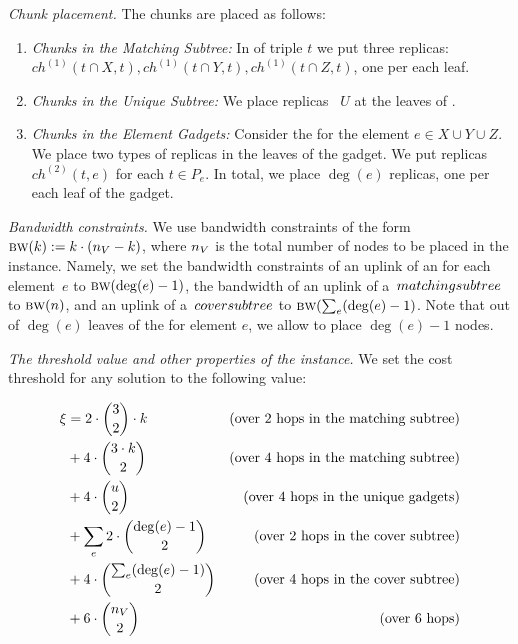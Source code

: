 \emph{Chunk placement.}
The chunks are placed as follows:
\begin{enumerate}
  \item \emph{Chunks in the Matching Subtree:} In {\TripleGadget} of triple $t$ we put
  three replicas:
 ~$ch^{(1)}(t \cap X, t), ch^{(1)}(t \cap Y, t), ch^{(1)}(t \cap Z, t)$, one per each leaf.
  \item \emph{Chunks in the Unique Subtree:} We place replicas
 ~$U$ at the leaves of \UnqGadgets.
 \item \emph{Chunks in the Element Gadgets:} Consider the \ElGadget{} for the element $e \in X\cup Y\cup Z$.
 We place two types of replicas in the leaves of the gadget.
 We put replicas $ch^{(2)}(t, e)$ for each $t \in P_e$.
 In total, we place $\deg(e)$ replicas, one per each leaf of the gadget.
\end{enumerate}

\emph{Bandwidth constraints.} We use bandwidth constraints of the form
$\textsc{bw}(k) := k\cdot(n_V - k)$, where $n_V$ is the total number of nodes to be placed in the instance. Namely, we set the bandwidth
constraints of an uplink of an {\ElGadget} for each element~$e$ to 
$\textsc{bw}(\deg(e)-1)$, the bandwidth of an uplink of a~${{matching subtree}}$ to 
$\textsc{bw}(n)$, and an uplink of a~${{cover subtree}}$ to 
$\textsc{bw}(\sum_e (\deg(e)-1)$.
Note that out of $\deg(e)$ leaves of the \ElGadget{} for element $e$, we allow to place $\deg(e)-1$ nodes.

\emph{The threshold value and other properties of the instance.} We set the
cost threshold for any solution to the following value:

\begin{align*}
  \xi  & = 2\cdot \binom{3}{2}\cdot k & \mbox{(over 2 hops in the {{matching subtree}}{})}\\
        & + 4 \cdot \binom{3\cdot k}{2} & \mbox{(over 4 hops in the {{matching subtree}}{})}\\
        & + 4 \cdot \binom{u}{2} & \mbox{(over 4 hops in the {{unique gadgets}}{})}\\
        & + \sum_e 2\cdot\binom{\deg(e)-1}{2} & \mbox{(over 2 hops in the {{cover subtree}}{})}\\
        & + 4\cdot \binom{\sum_e(\deg(e)-1)}{2} & \mbox{(over 4 hops in the {{cover subtree}}{})}\\
        & + 6\cdot\binom{n_V}{2} & \mbox{(over 6 hops)}
\end{align*}

